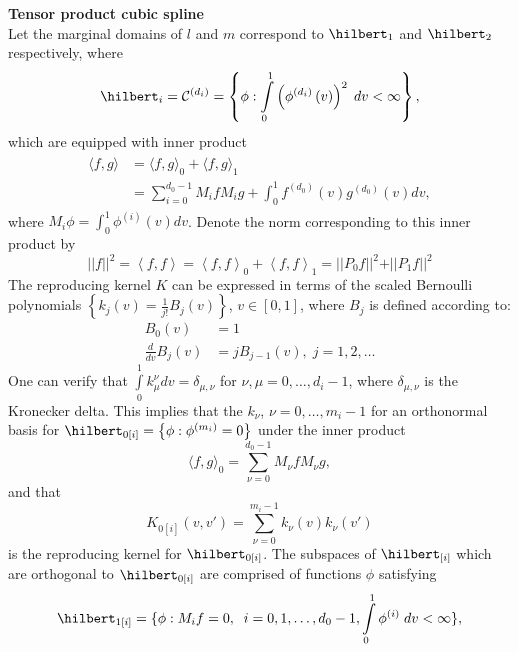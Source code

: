 \begin{example}{\textbf {Tensor product cubic spline}}\\
\vspace{0.5cm}
Let the marginal domains of $l$ and $m$ correspond to $\hilbert_1$ and $\hilbert_2$ respectively, where
\[
\hilbert_i = \mathcal{C}^{\left(d_i\right)} = \left\{ \phi: \int \limits_{0}^1 \left(\phi^{\left(d_i\right)}\left(v\right)\right)^2\;dv < \infty  \right\},
\]
\noindent
which are equipped with inner product
\begin{align}
\begin{split}
\langle f,g\rangle &= \langle f,g\rangle_0 + \langle f,g\rangle_1\\
 &= \sum_{i=0}^{d_0-1}M_{i} f M_{i} g + \int_0^1 f^{\left( d_0 \right)}\left(v\right)g^{\left( d_0 \right)}\left(v\right)dv,%
\end{split}
\end{align}
\noindent
where $M_i \phi = \int_0^1 \phi^{\left( i \right)}\left(v\right) dv$. Denote the norm corresponding to this inner product by
\[
\vert \vert f \vert \vert^2 = \left< f,f\right> = \left< f,f\right>_0 + \left< f,f\right>_1 = \vert \vert P_0 f \vert \vert^2 + \vert \vert P_1 f \vert \vert^2
\]
\noindent
The reproducing kernel $K$ can be expressed in terms of the scaled Bernoulli polynomials $\left\{ k_j\left(v\right) = \frac{1}{j!}B_j\left(v\right) \right\}$, $v \in \left[0,1\right]$, where $B_j$ is defined according to:
\begin{align*}
B_0\left(v\right) &= 1\\
\frac{d}{dv} B_j\left(v\right) &= jB_{j-1}\left(v\right), \;j = 1, 2, \dots
\end{align*}
\noindent
One can verify that $\int \limits_0^1 k_\mu^\nu dv = \delta_{\mu,\nu}$ for $\nu, \mu= 0,\dots, d_i -1$, where $\delta_{\mu,\nu}$ is the Kronecker delta. This implies that the $k_\nu$, $\nu = 0,\dots, m_i-1$ for an orthonormal basis for $\hilbert_{0\left[i\right]} = \left\{ \phi: \phi^{\left( m_i \right)} = 0 \right\}$ under the inner product
\[
\langle f,g\rangle_0 =  \sum_{\nu=0}^{d_0-1}M_{\nu} f M_{\nu} g,%
\]
\noindent
and that 
\[
K_{0\left[i\right]}\left(v,v'\right) = \sum_{\nu=0}^{m_i-1}  k_\nu\left(v\right)  k_\nu\left(v'\right) 
\]
\noindent
is the reproducing kernel for $\hilbert_{0\left[i\right]}$. The subspaces of $\hilbert_{\left[i\right]}$ which are orthogonal to $\hilbert_{0\left[i\right]}$ are comprised of functions $\phi$ satisfying 
\[
\hilbert_{1\left[i\right]} = \lbrace \phi: M_i f = 0,\;\; i = 0,1,\dots, d_0-1,\int\limits_{0}^1 \phi^{\left(i\right)}\;dv < \infty \rbrace, %
\]
\end{example}
